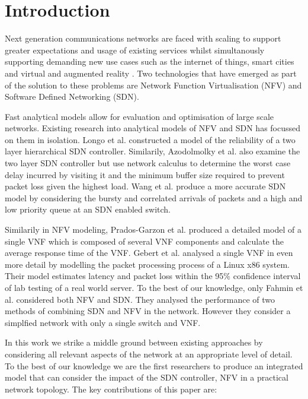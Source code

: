 
\section{Introduction}
\label{sec:introduction}

Next generation communications networks are faced with scaling to support greater expectations and usage of existing services \cite{AndrewsBCHLSZ14} whilst simultanously supporting demanding new use cases such as the internet of things, smart cities and virtual and augmented reality \cite{GSA15}. Two technologies that have emerged as part of the solution to these problems are Network Function Virtualisation (NFV) and Software Defined Networking (SDN).

Fast analytical models allow for evaluation and optimisation of large scale networks. Existing research into analytical models of NFV and SDN has focussed on them in isolation. Longo et al. \cite{LongoDBS15} constructed a model of the reliability of a two layer hierarchical SDN controller. Similarily, Azodolmolky et al. \cite{AzodolmolkyWY13} also examine the two layer SDN controller but use network calculus to determine the worst case delay incurred by visiting it and the minimum buffer size required to prevent packet loss given the highest load. Wang et al. \cite{MiaoMWWH16} produce a more accurate SDN model by considering the bursty and correlated arrivals of packets and a high and low priority queue at an SDN enabled switch.

Similarily in NFV modeling, Prados-Garzon et al. \cite{Prados-GarzonAR17} produced a detailed model of a single VNF which is composed of several VNF components and calculate the average response time of the VNF. Gebert et al. \cite{GebertZLST16} analysed a single VNF in even more detail by modelling the packet processing process of a Linux x86 system. Their model estimates latency and packet loss within the 95\% confidence interval of lab testing of a real world server. To the best of our knowledge, only Fahmin et al. \cite{FahminLHLS17} considered both NFV and SDN. They analysed the performance of two methods of combining SDN and NFV in the network. However they consider a simplfied network with only a single switch and VNF.

In this work we strike a middle ground between existing approaches by considering all relevant aspects of the network at an appropriate level of detail. To the best of our knowledge we are the first researchers to produce an integrated model that can consider the impact of the SDN controller, NFV in a practical network topology. The key contributions of this paper are:

